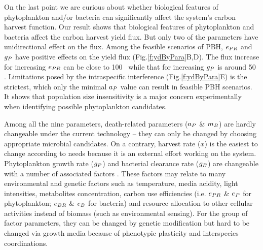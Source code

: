 \documentclass[../thesis.tex]{subfiles} %
\begin{document}
On the last point we are curious about whether biological features of phytoplankton and/or bacteria can significantly affect the system’s carbon harvest function.  Our result shows that biological features of phytoplankton and bacteria affect the carbon harvest yield flux.  But only two of the parameters have unidirectional effect on the flux.  Among the feasible scenarios of PBH, $e_{PR}$ and $g_P$ have positive effects on the yield flux (Fig.\ref{f:ydByPara}B,D).  The flux increase for increasing $e_{PR}$ can be close to 100 \dxdt\ while that for increasing $g_P$ is around 50 \dxdt.  Limitations posed by the intraspecific interference (Fig.\ref{f:ydByPara}E) is the strictest, which only the minimal $a_P$ value can result in feasible PBH scenarios.  It shows that population size insensitivity is a major concern experimentally when identifying possible phytoplankton candidates.

Among all the nine parameters, death-related parameters ($a_P$ \& $m_B$) are hardly changeable under the current technology -- they can only be changed by choosing appropriate microbial candidates.  On a contrary, harvest rate ($x$) is the easiest to change according to needs because it is an external effort working on the system.  Phytoplankton growth rate ($g_P$) and bacterial clearance rate ($g_B$) are changeable with a number of associated factors \autocite{park2020potential}.  These factors may relate to many environmental and genetic factors such as temperature, media acidity, light intensities, metabolites concentration, carbon use efficiencies (i.e. $e_{PR}$ \& $e_P$ for phytoplankton; $e_{BR}$ \& $e_B$ for bacteria) and resource allocation to other cellular activities instead of biomass (such as environmental sensing).  For the group of factor parameters, they can be changed by genetic modification \autocite{} but hard to be changed via growth media because of phenotypic plasticity and interspecies coordinations.
\end{document}

